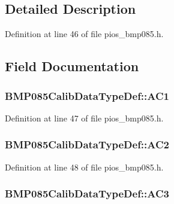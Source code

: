 \subsection{Detailed Description}


Definition at line 46 of file pios\-\_\-bmp085.\-h.



\subsection{Field Documentation}
\hypertarget{struct_b_m_p085_calib_data_type_def_a161f72fdd77f428497ee05b818064f40}{
\subsubsection[{A\-C1}]{ B\-M\-P085\-Calib\-Data\-Type\-Def\-::\-A\-C1}}\label{struct_b_m_p085_calib_data_type_def_a161f72fdd77f428497ee05b818064f40}


Definition at line 47 of file pios\-\_\-bmp085.\-h.

\hypertarget{struct_b_m_p085_calib_data_type_def_ac4f5e67f3bb8b7302d1394e3e0fa60fa}{
\subsubsection[{A\-C2}]{ B\-M\-P085\-Calib\-Data\-Type\-Def\-::\-A\-C2}}\label{struct_b_m_p085_calib_data_type_def_ac4f5e67f3bb8b7302d1394e3e0fa60fa}


Definition at line 48 of file pios\-\_\-bmp085.\-h.

\hypertarget{struct_b_m_p085_calib_data_type_def_a482f54f54d2adcb6e34ec46f9ad621e0}{
\subsubsection[{A\-C3}]{ B\-M\-P085\-Calib\-Data\-Type\-Def\-::\-A\-C3}}\label{struct_b_m_p085_calib_data_type_def_a482f54f54d2adcb6e34ec46f9ad621e0}


